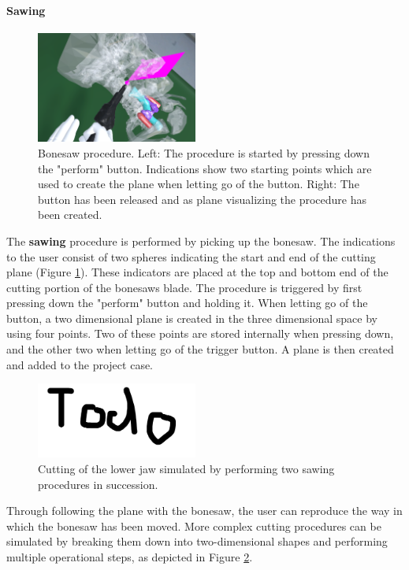 \paragraph{Sawing}

\begin{figure}[ht]
    \centering
    \includegraphics[width=200px]{images/implementation/features/procedures/bonesaw.png}
    \caption{\label{fig::FeatureBoneSaw}Bonesaw procedure. Left: The procedure is started by pressing down the "perform" button. Indications show two starting points which are 
    used to create the plane when letting go of the button. Right: The button has been released and as plane visualizing the procedure has been created.}
\end{figure}

The \textbf{sawing} procedure is performed by picking up the bonesaw.
The indications to the user consist of two spheres indicating the start and end of the cutting plane (Figure \ref{fig::FeatureBoneSaw}).
These indicators are placed at the top and bottom end of the cutting portion of the bonesaws blade.
The procedure is triggered by first pressing down the "perform" button and holding it.
When letting go of the button, a two dimensional plane is created in the three dimensional space by using four points.
Two of these points are stored internally when pressing down, and the other two when letting go of the trigger button.
A plane is then created and added to the project case.

\begin{figure}[ht]
    \centering
    \includegraphics[width=200px]{images/todo.png}
    \caption{\label{fig::MultipleSawing}Cutting of the lower jaw simulated by performing two sawing procedures in succession.}
\end{figure}

Through following the plane with the bonesaw, the user can reproduce the way in which the bonesaw has been moved.
More complex cutting procedures can be simulated by breaking them down into two-dimensional shapes and performing multiple operational steps, as depicted in Figure \ref{fig::MultipleSawing}.